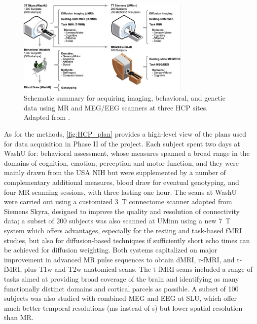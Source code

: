 \begin{figure}[htbp]
    \centering
    \includegraphics[width = 0.75\textwidth]{assets/images/HCP_plan.png}
    \caption[HCP Image Acquisition Schematic Summary]{Schematic summary for acquiring imaging, behavioral, and genetic data using \gls{MR} and \gls{MEG}/\gls{EEG} scanners at three \gls{HCP} sites. Adapted from \cite{HCP}.}
    \label{fig:HCP_plan}
\end{figure}

As for the methods, \autoref{fig:HCP_plan} provides a high-level view of the plans used for data acquisition in Phase II of the project. Each subject spent two days at \gls{WashU} for: behavioral assessment, whose measures spanned a broad range in the domains of cognition, emotion, perception and motor function, and they were mainly drawn from the \gls{USA} \gls{NIH} but were supplemented by a number of complementary additional measures, blood draw for eventual genotyping, and four \gls{MR} scanning sessions, with three lasting one hour. The scans at \gls{WashU} were carried out using a customized \SI{3}{\tesla} connectome scanner adapted from Siemens Skyra, designed to improve the quality and resolution of connectivity data; a subset of 200 subjects was also scanned at \gls{UMinn} using a new \SI{7}{\tesla} system which offers advantages, especially for the resting and task-based fMRI studies, but also for diffusion-based techniques if sufficiently short echo times can be achieved for diffusion weighting. Both systems capitalized on major improvement in advanced \gls{MR} pulse sequences to obtain \gls{dMRI}, \gls{r-fMRI}, and \gls{t-fMRI}, plus \gls{T1w} and \gls{T2w} anatomical scans. The \gls{t-fMRI} scans included a range of tasks aimed at providing broad coverage of the brain and identifying as many functionally distinct domains and cortical parcels as possible. A subset of 100 subjects was also studied with combined \gls{MEG} and \gls{EEG} at \gls{SLU}, which offer much better temporal resolutions (\si{\milli\second} instead of \si{\second}) but lower spatial resolution than \gls{MR}. 


